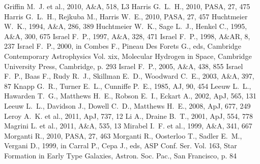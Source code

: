 \documentclass[useAMS,usenatbib,usegraphicx]{mn2e}
\newcommand{\aj}{AJ}                   %
\newcommand{\apj}{ApJ}                 %
\newcommand{\aap}{A\&A}                %
\newcommand{\aapr}{A\&AR}              %
\newcommand{\pasa}{PASA}               %
\begin{document}
\begin{thebibliography}{}
 Griffin M.~J. et al., 2010, \aap, 518, L3
 Harris G.~L.~H., 2010, \pasa, 27, 475
 Harris G.~L.~H., Rejkuba M., Harris W.~E., 2010, \pasa, 27, 457
 Huchtmeier W.~K., 1994, \aap, 286, 389
 Huchtmeier W.~K., Sage L.~J., Henkel C., 1995, \aap, 300, 675
 Israel F.~P., 1997, \aap, 328, 471
 Israel F.~P., 1998, \aapr, 8, 237
 Israel F.~P., 2000, in Combes F., Pineau Des Forets G., eds, Cambridge Contemporary Astrophysics Vol. xix,  Molecular Hydrogen in Space, Cambridge University Press, Cambridge, p. 293
 Israel F.~P., 2005, \aap, 438, 855
 Israel F.~P., Baas F., Rudy R.~J., Skillman E.~D., Woodward C.~E., 2003, \aap, 397, 87
 Knapp G.~R., Turner E.~L., Cunniffe P.~E., 1985, \aj, 90, 454
 Leeuw L.~L., Hawarden T.~G., Matthews H.~E., Robson E.~I., Eckart A., 2002, \apj, 565, 131
 Leeuw L.~L., Davidson J., Dowell C.~D., Matthews H.~E., 2008, \apj, 677, 249
 Leroy A.~K. et al., 2011, \apj, 737, 12
 Li A., Draine B.~T., 2001, \apj, 554, 778
 Magrini L. et al., 2011, \aap, 535, 13
 Mirabel I.~F. et al., 1999, \aap, 341, 667
 Morganti R., 2010, \pasa, 27, 463
 Morganti R., Oosterloo T., Sadler E.~M., Vergani D., 1999, in Carral P., Cepa J., eds, ASP Conf. Ser. Vol. 163, Star Formation in Early Type Galaxies, Astron. Soc. Pac., San Francisco, p. 84

\end{thebibliography}
\end{document}
